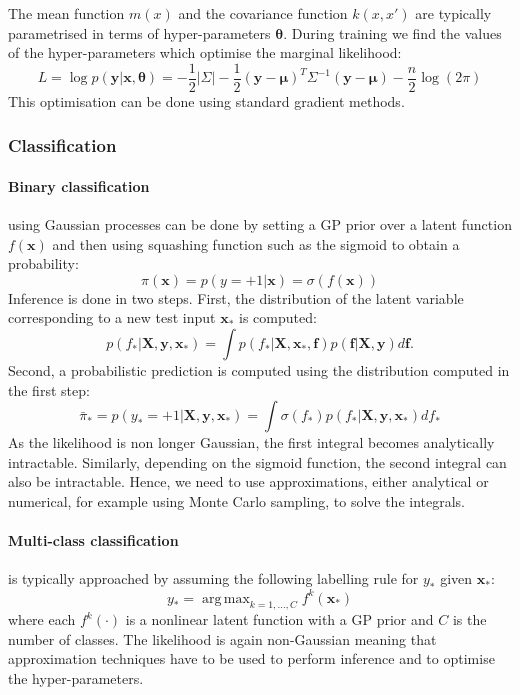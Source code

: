 \documentclass{article}
\DeclareMathOperator*{\argmax}{arg\,max} %
\begin{document}
The mean function $m(x)$ and the covariance function $k(x,x')$ are typically parametrised in terms of hyper-parameters $\bm{\theta}$. During training we find the values of the hyper-parameters which optimise the marginal likelihood:
\begin{equation*}
	L = \log p(\bm{y}\vert\bm{x},\bm{\theta}) = -\frac{1}{2}\vert\Sigma\vert - \frac{1}{2}(\bm{y}-\bm{\mu})^T\Sigma^{-1}(\bm{y}-\bm{\mu}) - \frac{n}{2}\log(2\pi)
\end{equation*}
This optimisation can be done using standard gradient methods.
\subsubsection{Classification}
\paragraph{Binary classification} using Gaussian processes can be done by setting a GP prior over a latent function $f(\mathbf{x})$ and then using squashing function such as the sigmoid to obtain a probability:
\begin{equation*}
	\pi(\mathbf{x}) = p(y = +1 \vert \mathbf{x}) = \sigma(f(\mathbf{x}))
\end{equation*}
Inference is done in two steps. First, the distribution of the latent variable corresponding to a new test input $\mathbf{x}_*$ is computed:
\begin{equation*}
	p(f_*  \vert \mathbf{X}, \mathbf{y}, \mathbf{x}_*) = \int p (f_*  \vert \mathbf{X}, \mathbf{x}_*, \mathbf{f}) p(\mathbf{f} \vert \mathbf{X}, \mathbf{y}) d\mathbf{f}.
\end{equation*}
Second, a probabilistic prediction is computed using the distribution computed in the first step:
\begin{equation*}
	\bar{\pi}_* = p(y_* = +1 |\mathbf{X}, \mathbf{y}, \mathbf{x}_*) = \int \sigma(f_*) p(f_*  \vert \mathbf{X}, \mathbf{y}, \mathbf{x}_*) df_*
\end{equation*}
As the likelihood is non longer Gaussian, the first integral becomes analytically intractable. Similarly, depending on the sigmoid function, the second integral can also be intractable. Hence, we need to use approximations, either analytical or numerical, for example using Monte Carlo sampling, to solve the integrals.


\paragraph{Multi-class classification} is typically \cite{villacampa2017scalable} approached by assuming the following labelling rule for $y_*$ given $\mathbf{x}_*$:
\begin{equation*}
	y_* = \argmax_{k=1,\dots,C} f^k(\mathbf{x}_*)
\end{equation*} 
where each $f^k(\cdot)$ is a nonlinear latent function with a GP prior and $C$ is the number of classes. The likelihood is again non-Gaussian meaning that approximation techniques have to be used to perform inference and to optimise the hyper-parameters.
\end{document}
